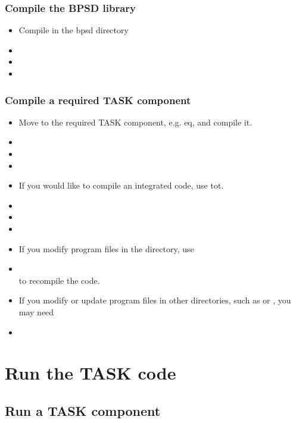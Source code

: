 \documentclass[11pt]{article}
\begin{document}
\subsubsection{Compile the BPSD library}

\begin{itemize}
\item
Compile in the bpsd directory
\item[\qquad]
\item[\qquad]
\item[\qquad]
\end{itemize}

\subsubsection{Compile a required TASK component}

\begin{itemize}
\item
Move to the required TASK component, e.g. eq, and compile it.
\item[\qquad]
\item[\qquad]
\item[\qquad]
\item
If you would like to compile an integrated code, use tot.
\item[\qquad]
\item[\qquad]
\item[\qquad]
\item
If you modify program files in the directory, use
\item[\qquad]
\\
to recompile the code.
\item
If you modify or update program files in other directories, such as
 or , you may need 
\item[\qquad]
\end{itemize}

\section{Run the TASK code}

\subsection{Run a TASK component}
\end{document}
